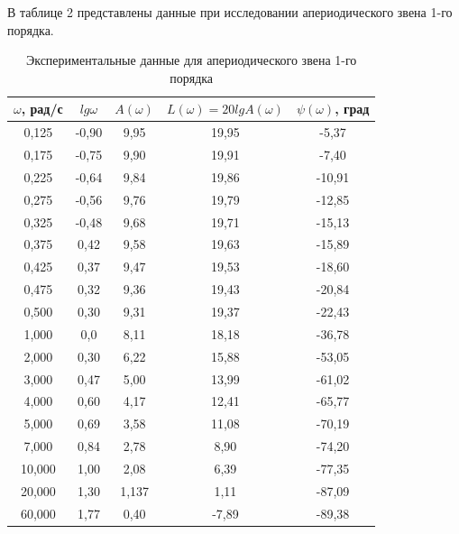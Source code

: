 \documentclass[a4paper,12pt]{article} %
\begin{document}
В таблице 2 представлены данные при исследовании апериодического звена 1-го порядка.
\begin{table}[h!]
	\renewcommand{\arraystretch}{1.8} %
	\centering
	\begin{threeparttable}
		\caption{Экспериментальные данные для апериодического звена 1-го порядка}
		\begin{tabular}{|c|c|c|c|c|}
			\hline $\omega$, рад/с & $lg\omega$ & $A(\omega)$ & $L(\omega)=20lgA(\omega)$ & $\psi(\omega)$, град\\
			\hline 0,125 & -0,90 & 9,95 & 19,95 & -5,37\\
			\hline 0,175 & -0,75 & 9,90 & 19,91 & -7,40\\
			\hline 0,225 & -0,64 & 9,84 & 19,86 & -10,91\\
			\hline 0,275 & -0,56 & 9,76 & 19,79 & -12,85\\
			\hline 0,325 & -0,48 & 9,68 & 19,71 & -15,13\\
			\hline 0,375 & 0,42 & 9,58 & 19,63 & -15,89\\
			\hline 0,425 & 0,37 & 9,47 & 19,53 & -18,60\\
			\hline 0,475 & 0,32 & 9,36 & 19,43 & -20,84\\
			\hline 0,500 & 0,30 & 9,31 & 19,37 & -22,43\\
			\hline 1,000 & 0,0 & 8,11 & 18,18 & -36,78\\
			\hline 2,000 & 0,30 & 6,22 & 15,88 & -53,05\\
			\hline 3,000 & 0,47 & 5,00 & 13,99 & -61,02\\
			\hline 4,000 & 0,60 & 4,17 & 12,41 & -65,77\\
			\hline 5,000 & 0,69 & 3,58 & 11,08 & -70,19\\
			\hline 7,000 & 0,84 & 2,78 & 8,90 & -74,20\\
			\hline 10,000 & 1,00 & 2,08 & 6,39 & -77,35\\			
			\hline 20,000 & 1,30 & 1,137 & 1,11 & -87,09\\			
			\hline 60,000 & 1,77 & 0,40 & -7,89 & -89,38\\			
			\hline
		\end{tabular}
	\end{threeparttable}
\end{table}
\end{document}
